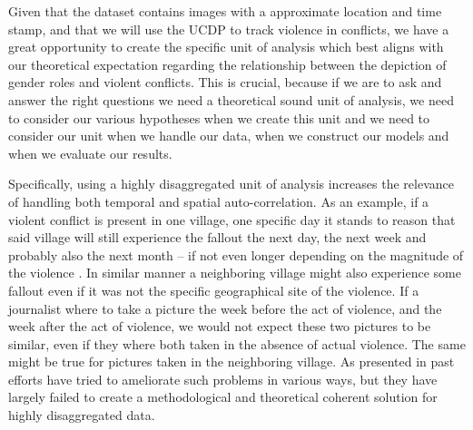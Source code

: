 \documentclass[a4paper]{article}
\begin{document}
Given that the dataset contains images with a approximate location and time stamp, and that we will use the UCDP to track violence in conflicts, we have a great opportunity to create the specific unit of analysis which best aligns with our theoretical expectation regarding the relationship between the depiction of gender roles and violent conflicts. This is crucial, because if we are to ask and answer the right questions we need a theoretical sound unit of analysis, we need to consider our various hypotheses when we create this unit and we need to consider our unit when we handle our data, when we construct our models and when we evaluate our results.\par 

Specifically, using a highly disaggregated unit of analysis increases the relevance of handling both temporal and spatial auto-correlation. As an example, if a violent conflict is present in one village, one specific day it stands to reason that said village will still experience the fallout the next day, the next week and probably also the next month -- if not even longer depending on the magnitude of the violence \cite[15-17]{SPECIALE}. In similar manner a neighboring village might also experience some fallout even if it was not the specific geographical site of the violence. If a journalist where to take a picture the week before the act of violence, and the week after the act of violence, we would not expect these two pictures to be similar, even if they where both taken in the absence of actual violence. The same might be true for pictures taken in the neighboring village. As presented in \cite{SPECIALE} past efforts have tried to ameliorate such problems in various ways, but they have largely failed to create a methodological and theoretical coherent solution for highly disaggregated data.\par 
\end{document}
